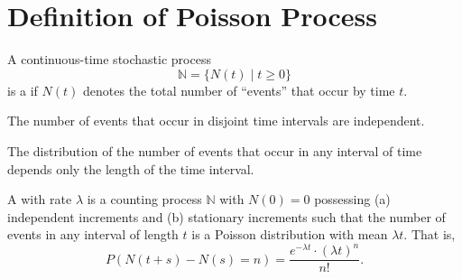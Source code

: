 \section{Definition of Poisson Process}

A continuous-time stochastic process
\[ \mathbb{N} = \{ N(t) \mid t \ge 0 \} \]
is a  if $ N(t) $ denotes the total number of ``events'' that occur by time $ t $.
\begin{comment}
$ N(t) $: non-negative integer, increases as $ t $ increases.
\end{comment}

\begin{definition}
The number of events that occur in disjoint time intervals are independent.
\end{definition}

\begin{definition}
The distribution of the number of events that occur in any interval of time depends only the length of the time interval.
\end{definition}

\begin{definition}
A  with rate $ \lambda $ is a counting process $ \mathbb{N} $ with $ N(0) = 0 $ possessing (a) independent increments and (b) stationary increments such that the number of events in any interval of length $ t $ is a Poisson distribution with mean $ \lambda t $. That is,
\[ P(N(t + s) - N(s) = n) = \frac{e^{-\lambda t} \cdot (\lambda t)^{n}}{n!}. \]
\end{definition}

